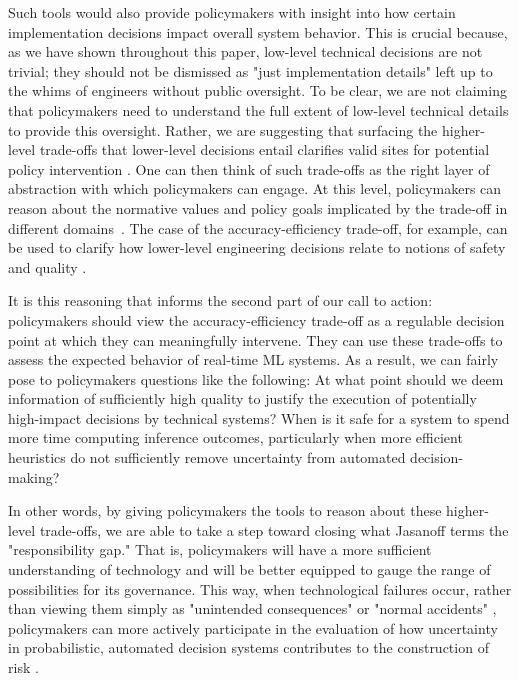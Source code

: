 \documentclass[sigplan,screen]{acmart}
\begin{document}
Such tools would also provide policymakers with insight into how certain implementation decisions impact overall system behavior. This is crucial because, as we have shown throughout this paper, low-level technical decisions are not trivial; they should not be dismissed as "just implementation details" left up to the whims of engineers without public oversight. To be clear, we are not claiming that policymakers need to understand the full extent of low-level technical details to provide this oversight. Rather, we are suggesting that surfacing the higher-level trade-offs that lower-level decisions entail clarifies valid sites for potential policy intervention \cite{cooper2020law, mulligan2018governance, jasanoff2016ethics}. One can then think of such trade-offs as the right layer of abstraction with which policymakers can engage. At this level, policymakers can reason about the normative values and policy goals implicated by the trade-off in different domains~\cite{cooper2020law, flanagan2008values, friedman2019values}. The case of the accuracy-efficiency trade-off, for example, can be used to clarify how lower-level engineering decisions relate to notions of safety and quality \cite{sampson2015thesis}.

It is this reasoning that informs the second part of our call to action: policymakers should view the accuracy-efficiency trade-off as a regulable decision point at which they can meaningfully intervene. They can use these trade-offs to assess the expected behavior of real-time ML systems. As a result, we can fairly pose to policymakers questions like the following: At what point should we deem information of sufficiently high quality to justify the execution of potentially high-impact decisions by technical systems? When is it safe for a system to spend more time computing inference outcomes, particularly when more efficient heuristics do not sufficiently remove uncertainty from automated decision-making?

In other words, by giving policymakers the tools to reason about these higher-level trade-offs, we are able to take a step toward closing what Jasanoff terms the "responsibility gap." That is, policymakers will have a more sufficient understanding of technology and will be better equipped to gauge the range of possibilities for its governance. This way, when technological failures occur, rather than viewing them simply as "unintended consequences" or "normal accidents" \cite{perrow1999risk}, policymakers can more actively participate in the evaluation of how uncertainty in probabilistic, automated decision systems contributes to the construction of risk \cite{jasanoff2016ethics, hilgartner1992risk}.
\end{document}

